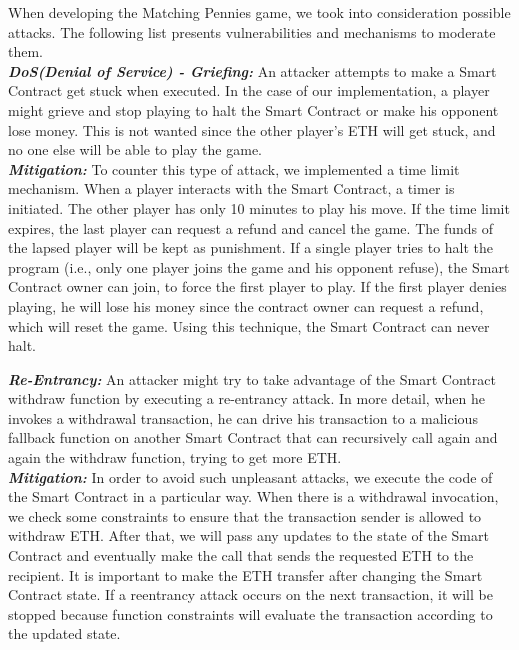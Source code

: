\documentclass[12pt,a4paper]{article}
\begin{document}
When developing the Matching Pennies game, we took into consideration possible attacks.
The following list presents vulnerabilities and mechanisms to moderate them. \\

\textbf{\emph{DoS(Denial of Service) - Griefing: }}An attacker attempts to make a Smart Contract get stuck when executed. In the case of our implementation, a player might grieve and stop playing to halt the Smart Contract or make his opponent lose money. This is not wanted since the other player’s ETH will get stuck, and no one else will be able to play the game. \\

\textbf{\emph{Mitigation: }}To counter this type of attack, we implemented a time limit mechanism. When a player interacts with the Smart Contract, a timer is initiated. The other player has only 10 minutes to play his move. If the time limit expires, the last player can request a refund and cancel the game. The funds of the lapsed player will be kept as punishment. If a single player tries to halt the program (i.e., only one player joins the game and his opponent refuse), the Smart Contract owner can join, to force the first player to play. If the first player denies playing, he will lose his money since the contract owner can request a refund, which will reset the game. Using this technique, the Smart Contract can never halt.\\

\pagebreak

\textbf{\emph{Re-Entrancy: }}An attacker might try to take advantage of the Smart Contract withdraw function by executing a re-entrancy attack. In more detail, when he invokes a withdrawal transaction, he can drive his transaction to a malicious fallback function on another Smart Contract that can recursively call again and again the withdraw function, trying to get more ETH.\\

\textbf{\emph{Mitigation: }}In order to avoid such unpleasant attacks, we execute the code of the Smart Contract in a particular way. When there is a withdrawal invocation, we check some constraints to ensure that the transaction sender is allowed to withdraw ETH. After that, we will pass any updates to the state of the Smart Contract and eventually make the call that sends the requested ETH to the recipient. It is important to make the ETH transfer after changing the Smart Contract state. If a reentrancy attack occurs on the next transaction, it will be stopped because function constraints will evaluate the transaction according to the updated state.\\
\end{document}
